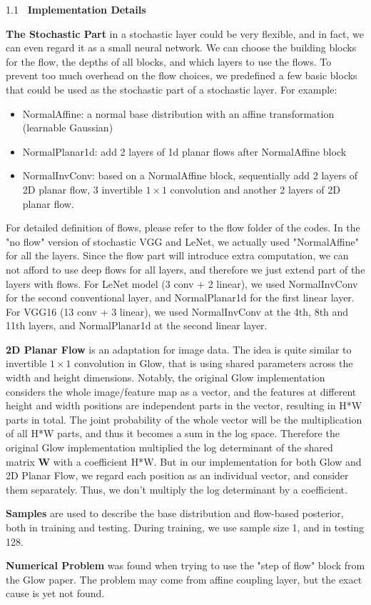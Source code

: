\documentclass[a4paper,11pt]{article} %
\newcommand{\lineSpace}{1.1}
\newcounter{rSection}
\newenvironment{rSection}[1]{ %
\refstepcounter{rSection}
\begin{spacing}{\lineSpace}
  {\bf \large \therSection~#1 \hfill}  %
	\vspace{0.25em}

}{
\vspace{1em}
\end{spacing}
}
\newenvironment{rlisting}{
  \vspace{-0.25em}
  \begin{itemize}
	\itemsep -0.25em \vspace{-0.5em}
}{
	\vspace{-0.5em}
\end{itemize}
\vspace{-0.25em}
}
\begin{document}
\begin{rSection}{Implementation Details}

\textbf{The Stochastic Part} in a stochastic layer could be very flexible, and in fact, we can even regard it as a small neural network. 
We can choose the building blocks for the flow, the depths of all blocks, and which layers to use the flows. 
To prevent too much overhead on the flow choices, we predefined a few basic blocks that could be used as the stochastic part of a stochastic layer. 
For example:
\begin{rlisting}
	\item NormalAffine: a normal base distribution with an affine transformation (learnable Gaussian)
	\item NormalPlanar1d: add 2 layers of 1d planar flows after NormalAffine block 
	\item NormalInvConv: based on a NormalAffine block, sequentially add 2 layers of 2D planar flow, 3 invertible $1 \times 1$ convolution and another 2 layers of 2D planar flow.
\end{rlisting}
For detailed definition of flows, please refer to the flow folder of the codes. 
In the "no flow" version of stochastic VGG and LeNet, we actually used "NormalAffine" for all the layers. 
Since the flow part will introduce extra computation, we can not afford to use deep flows for all layers, and therefore we just extend part of the layers with flows.
For LeNet model (3 conv + 2 linear), we used NormalInvConv for the second conventional layer, and NormalPlanar1d for the first linear layer.
For VGG16 (13 conv + 3 linear), we used NormalInvConv at the 4th, 8th and 11th layers, and NormalPlanar1d at the second linear layer.

\textbf{2D Planar Flow} is an adaptation for image data. 
The idea is quite similar to invertible $1 \times 1$ convolution in Glow, that is using shared parameters across the width and height dimensions.
Notably, the original Glow implementation considers the whole image/feature map as a vector, and the features at different height and width positions are independent parts in the vector, resulting in H*W parts in total. 
The joint probability of the whole vector will be the multiplication of all H*W parts, and thus it becomes a sum in the log space.
Therefore the original Glow implementation multiplied the log determinant of the shared matrix $\mathbf{W}$ with a coefficient H*W.
But in our implementation for both Glow and 2D Planar Flow, we regard each position as an individual vector, and consider them separately.
Thus, we don't multiply the log determinant by a coefficient.

\textbf{Samples} are used to describe the base distribution and flow-based posterior, both in training and testing. 
During training, we use sample size 1, and in testing 128.

\textbf{Numerical Problem} was found when trying to use the "step of flow" block from the Glow paper.
The problem may come from affine coupling layer, but the exact cause is yet not found. 

\end{rSection}
\end{document}
